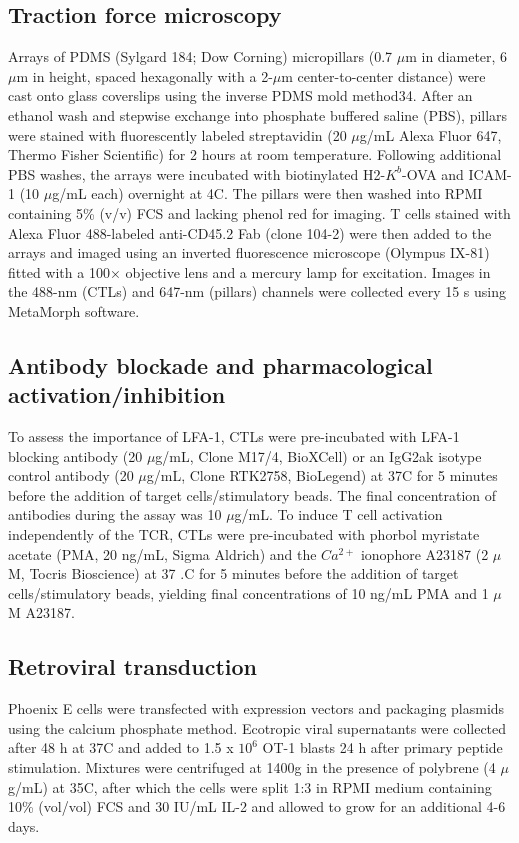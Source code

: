 \subsection{Traction force microscopy}
Arrays of PDMS (Sylgard 184; Dow Corning) micropillars (0.7 $\mu$m in diameter, 6 $\mu$m in height, spaced hexagonally with a 2-$\mu$m center-to-center distance) were cast onto glass coverslips using the inverse PDMS mold method34. After an ethanol wash and stepwise exchange into phosphate buffered saline (PBS), pillars were stained with fluorescently labeled streptavidin (20 $\mu$g/mL Alexa Fluor 647, Thermo Fisher Scientific) for 2 hours at room temperature. Following additional PBS washes, the arrays were incubated with biotinylated H2-$K^{b}$-OVA and ICAM-1 (10 $\mu$g/mL each) overnight at 4\degree C. The pillars were then washed into RPMI containing 5\% (v/v) FCS and lacking phenol red for imaging. T cells stained with Alexa Fluor 488-labeled anti-CD45.2 Fab (clone 104-2) were then added to the arrays and imaged using an inverted fluorescence microscope (Olympus IX-81) fitted with a 100× objective lens and a mercury lamp for excitation. Images in the 488-nm (CTLs) and 647-nm (pillars) channels were collected every 15 s using MetaMorph software.

\subsection{Antibody blockade and pharmacological activation/inhibition}
To assess the importance of LFA-1, CTLs were pre-incubated with LFA-1 blocking antibody (20 $\mu$g/mL, Clone M17/4, BioXCell) or an IgG2ak isotype control antibody (20 $\mu$g/mL, Clone RTK2758, BioLegend) at 37\degree C for 5 minutes before the addition of target cells/stimulatory beads. The final concentration of antibodies during the assay was 10 $\mu$g/mL. To induce T cell activation independently of the TCR, CTLs were pre-incubated with phorbol myristate acetate (PMA, 20 ng/mL, Sigma Aldrich) and the $Ca^{2+}$ ionophore A23187 (2 $\mu$M, Tocris Bioscience) at 37 .C for 5 minutes before the addition of target cells/stimulatory beads, yielding final concentrations of 10 ng/mL PMA and 1 $\mu$M A23187.

\subsection{Retroviral transduction}
Phoenix E cells were transfected with expression vectors and packaging plasmids using the calcium phosphate method. Ecotropic viral supernatants were collected after 48 h at 37\degree C and added to 1.5 x $10^{6}$ OT-1 blasts 24 h after primary peptide stimulation. Mixtures were centrifuged at 1400g in the presence of polybrene (4 $\mu$g/mL) at 35\degree C, after which the cells were split 1:3 in RPMI medium containing 10\% (vol/vol) FCS and 30 IU/mL IL-2 and allowed to grow for an additional 4-6 days.

